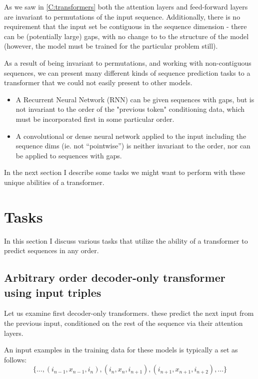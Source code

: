 As we saw in \cref{C:transformers} both the attention layers and feed-forward layers are invariant to permutations of the input sequence. Additionally, there is no requirement that the input set be contiguous in the sequence dimension - there can be (potentially large) gaps, with no change to to the structure of the model (however, the model must be trained for the particular problem still).

As a result of being invariant to permutations, and working with non-contiguous sequences, we can present many different kinds of sequence prediction tasks to a transformer that we could not easily present to other models.

\begin{itemize}
    \item A Recurrent Neural Network (RNN) can be given sequences with gaps, but is not invariant to the order of the "previous token" conditioning data, which must be incorporated first in some particular order.
    \item A convolutional or dense neural network applied to the input including the sequence dims (ie. not ``pointwise'') is neither invariant to the order, nor can be applied to sequences with gaps.
\end{itemize}

In the next section I describe some tasks we might want to perform with these unique abilities of a transformer.

\section{Tasks}
\label{s:order-tasks}

In this section I discuss various tasks that utilize the ability of a transformer to predict sequences in any order.

\subsection{Arbitrary order decoder-only transformer using input triples}
\label{ss:decoder-only-triples}

Let us examine first decoder-only transformers. these predict the next input from the previous input, conditioned on the rest of the sequence via their attention layers.

An input examples in the training data for these models is typically a set as follows:
$$
   \{ ..., (i_{n-1}, x_{n-1}, i_{n}), (i_{n}, x_{n}, i_{n+1}), (i_{n+1}, x_{n+1}, i_{n+2}), ... \}
$$

